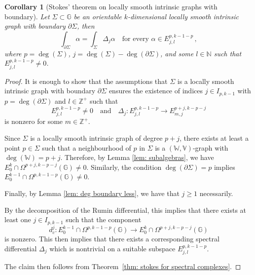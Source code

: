 \documentclass[dvipsnames]{amsart}
\newtheorem{corollary}[theorem]{Corollary}
\theoremstyle{definition}
\theoremstyle{definition}
\numberwithin{equation}{section}
\begin{document}
\begin{corollary}[Stokes' theorem on locally smooth intrinsic graphs with boundary]
\label{cor: stokes thm for intrinsic graphs}
Let $\Sigma\subset\mathbb{G}$ be an orientable $k$-dimensional locally smooth intrinsic graph with boundary $\partial\Sigma$, then
\[
\int_{\partial\Sigma}\alpha
=
\int_\Sigma \Delta_j \alpha
\quad
\text{for every } \alpha\in E_{j,l}^{p,k-1-p}\,,
\]
where $p=\operatorname{deg}(\Sigma)$, $j=\operatorname{deg}(\Sigma)-\operatorname{deg}(\partial
\Sigma)$, and some $l\in\mathbb{N}$ such that $E_{j,l}^{p,k-1-p}\neq 0$.
\end{corollary}

\begin{proof}
It is enough to show that the assumptions that $\Sigma$ is a locally smooth intrinsic graph with boundary $\partial\Sigma$ ensures the existence of indices $j\in I_{p,k-1}$ with $p=\operatorname{deg}(\partial\Sigma)$ and $l\in\mathbb{Z}^+$ such that
\[
E_{j,l}^{p,k-1-p}\neq 0
\quad\text{and}\quad
\Delta_j \colon E_{j,l}^{p,k-1-p}\longrightarrow E_{m,j}^{p+j,k-p-j}
\]
is nonzero for some $m\in\mathbb{Z}^+$.

Since $\Sigma$ is a locally smooth intrinsic graph of degree $p+j$, there exists at least a point $p\in\Sigma$ such that a neighbourhood of $p$ in $\Sigma$ is a $(\mathbb{W},\mathbb{V})$-graph with $\operatorname{deg}(\mathbb{W})=p+j$. Therefore, by Lemma \ref{lem: subalgebras}, we have $E_0^k \cap \Omega^{p+j,k-p-j}(\mathbb{G}) \neq 0$. Similarly, the condition $\deg(\partial\Sigma)=p$ implies
$E_0^{k-1} \cap \Omega^{p,k-1-p}(\mathbb{G}) \neq 0$. 

Finally, by Lemma \ref{lem: deg boundary less}, we have that $j\ge 1$ necessarily.

By the decomposition of the Rumin differential, this implies that there exists at least one $j\in I_{p,k-1}$ such that the component
\[
d_c^j \colon E_0^{k-1} \cap \Omega^{p,k-1-p}(\mathbb{G})
\longrightarrow
E_0^{k} \cap \Omega^{p+j,k-p-j}(\mathbb{G})
\]
is nonzero. This then implies that there exists a corresponding spectral differential $\Delta_j$ which is nontrivial on a suitable subspace $E_{j,l}^{p,k-1-p}$.

The claim then follows from Theorem~\ref{thm: stokes for spectral complexes}.
\end{proof}
\end{document}

